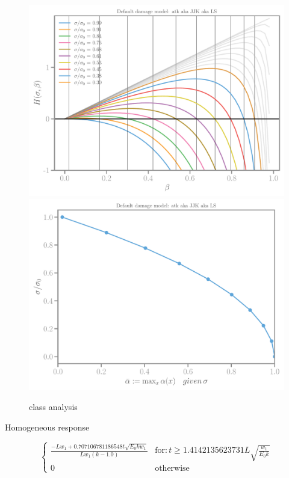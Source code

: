 \documentclass[]{article}
\begin{document}
\begin{figure}[htbp]
  \includegraphics[width=.33\textheight]{../figures/atk-Hbeta.pdf}
  \includegraphics[width=.33\textheight]{../figures/atk-maxalpha.pdf}
  \caption{class analysis}
  \label{fig:class-analyser}
\end{figure}





Homogeneous response

\begin{equation}
  \label{eqn:mod-homog}
  \begin{cases}
    \frac{- L w_{1} + 0.707106781186548 t \sqrt{E_{0} k w_{1}}}{L w_{1} \left(k - 1.0\right)} & \text{for} : t \geq 1.4142135623731 L \sqrt{\frac{w_{1}}{E_{0} k}} \\ 
    0 & \text{otherwise} 
  \end{cases}
\end{equation}
\end{document}
